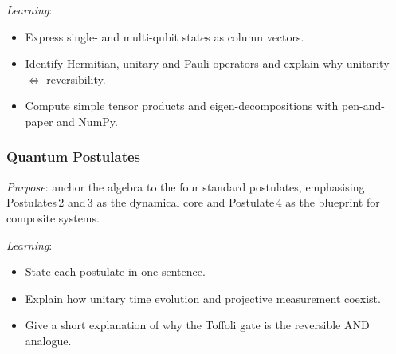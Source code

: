 \emph{Learning}:
\begin{itemize}
	\item Express single- and multi-qubit states as column vectors.

	\item Identify Hermitian, unitary and Pauli operators and explain why unitarity $\iff$ reversibility.

	\item Compute simple tensor products and eigen-decompositions with pen-and-paper and NumPy.
\end{itemize}




\subsubsection{Quantum Postulates}

\emph{Purpose}: anchor the algebra to the four standard postulates, 
emphasising Postulates\,2 and\,3 as the dynamical core and Postulate\,4 as the blueprint for composite systems.

\emph{Learning}:
\begin{itemize}
	\item State each postulate in one sentence.
	\item Explain how unitary time evolution and projective measurement coexist.
	\item Give a short explanation of why the Toffoli gate is the reversible AND analogue.
\end{itemize}

	
